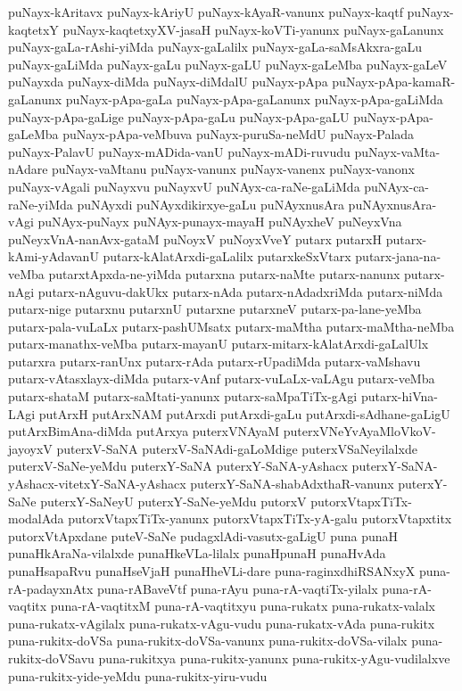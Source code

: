{puNayx-kAritavx
puNayx-kAriyU
puNayx-kAyaR-vanunx
puNayx-kaqtf
puNayx-kaqtetxY
puNayx-kaqtetxyXV-jasaH
puNayx-koVTi-yanunx
puNayx-gaLanunx
puNayx-gaLa-rAshi-yiMda
puNayx-gaLalilx
puNayx-gaLa-saMsAkxra-gaLu
puNayx-gaLiMda
puNayx-gaLu
puNayx-gaLU
puNayx-gaLeMba
puNayx-gaLeV
puNayxda
puNayx-diMda
puNayx-diMdalU
puNayx-pApa
puNayx-pApa-kamaR-gaLanunx
puNayx-pApa-gaLa
puNayx-pApa-gaLanunx
puNayx-pApa-gaLiMda
puNayx-pApa-gaLige
puNayx-pApa-gaLu
puNayx-pApa-gaLU
puNayx-pApa-gaLeMba
puNayx-pApa-veMbuva
puNayx-puruSa-neMdU
puNayx-Palada
puNayx-PalavU
puNayx-mADida-vanU
puNayx-mADi-ruvudu
puNayx-vaMta-nAdare
puNayx-vaMtanu
puNayx-vanunx
puNayx-vanenx
puNayx-vanonx
puNayx-vAgali
puNayxvu
puNayxvU
puNAyx-ca-raNe-gaLiMda
puNAyx-ca-raNe-yiMda
puNAyxdi
puNAyxdikirxye-gaLu
puNAyxnusAra
puNAyxnusAra-vAgi
puNAyx-puNayx
puNAyx-punayx-mayaH
puNAyxheV
puNeyxVna
puNeyxVnA-nanAvx-gataM
puNoyxV
puNoyxVveY
putarx
putarxH
putarx-kAmi-yAdavanU
putarx-kAlatArxdi-gaLalilx
putarxkeSxVtarx
putarx-jana-na-veMba
putarxtApxda-ne-yiMda
putarxna
putarx-naMte
putarx-nanunx
putarx-nAgi
putarx-nAguvu-dakUkx
putarx-nAda
putarx-nAdadxriMda
putarx-niMda
putarx-nige
putarxnu
putarxnU
putarxne
putarxneV
putarx-pa-lane-yeMba
putarx-pala-vuLaLx
putarx-pashUMsatx
putarx-maMtha
putarx-maMtha-neMba
putarx-manathx-veMba
putarx-mayanU
putarx-mitarx-kAlatArxdi-gaLalUlx
putarxra
putarx-ranUnx
putarx-rAda
putarx-rUpadiMda
putarx-vaMshavu
putarx-vAtasxlayx-diMda
putarx-vAnf
putarx-vuLaLx-vaLAgu
putarx-veMba
putarx-shataM
putarx-saMtati-yanunx
putarx-saMpaTiTx-gAgi
putarx-hiVna-LAgi
putArxH
putArxNAM
putArxdi
putArxdi-gaLu
putArxdi-sAdhane-gaLigU
putArxBimAna-diMda
putArxya
puterxVNAyaM
puterxVNeYvAyaMloVkoV-jayoyxV
puterxV-SaNA
puterxV-SaNAdi-gaLoMdige
puterxVSaNeyilalxde
puterxV-SaNe-yeMdu
puterxY-SaNA
puterxY-SaNA-yAshacx
puterxY-SaNA-yAshacx-vitetxY-SaNA-yAshacx
puterxY-SaNA-shabAdxthaR-vanunx
puterxY-SaNe
puterxY-SaNeyU
puterxY-SaNe-yeMdu
putorxV
putorxVtapxTiTx-modalAda
putorxVtapxTiTx-yanunx
putorxVtapxTiTx-yA-galu
putorxVtapxtitx
putorxVtApxdane
puteV-SaNe
pudagxlAdi-vasutx-gaLigU
puna
punaH
punaHkAraNa-vilalxde
punaHkeVLa-lilalx
punaHpunaH
punaHvAda
punaHsapaRvu
punaHseVjaH
punaHheVLi-dare
puna-raginxdhiRSANxyX
puna-rA-padayxnAtx
puna-rABaveVtf
puna-rAyu
puna-rA-vaqtiTx-yilalx
puna-rA-vaqtitx
puna-rA-vaqtitxM
puna-rA-vaqtitxyu
puna-rukatx
puna-rukatx-valalx
puna-rukatx-vAgilalx
puna-rukatx-vAgu-vudu
puna-rukatx-vAda
puna-rukitx
puna-rukitx-doVSa
puna-rukitx-doVSa-vanunx
puna-rukitx-doVSa-vilalx
puna-rukitx-doVSavu
puna-rukitxya
puna-rukitx-yanunx
puna-rukitx-yAgu-vudilalxve
puna-rukitx-yide-yeMdu
puna-rukitx-yiru-vudu
}
